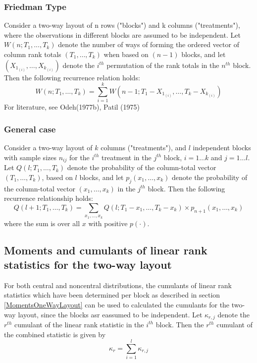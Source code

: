 \subsubsection{Friedman Type}
Consider a two-way  layout of n rows ("blocks") and k columns ("treatments"), where the observations in different blocks are assumed to be independent. Let $W(n;T_1,...,T_k)$ denote the number of ways of forming the ordered vector of column rank totals $(T_1,\ldots,T_k)$ when based on $(n-1)$ blocks, and let $(X_{1_{(i)}},\ldots,X_{k_{(i)}})$ denote the $i^{th}$ permutation of the rank totals in the $n^{th}$ block. Then the following recurrence relation holds:
\begin{equation} 
	W(n; T_1,\ldots,T_k) = \sum_{i=1}^k W(n-1; T_1 - X_{1_{(i)}},\ldots, T_k - X_{k_{(i)}})
\end{equation}
For literature, see Odeh(1977b), Patil (1975)

\subsubsection{General case}
Consider a two-way  layout of $k$ columns ("treatments"), and $l$ independent blocks with sample sizes $n_{ij}$ for the $i^{th}$ treatment in the $j^{th}$ block, $i=1 \ldots k$ and $j=1 \ldots l$. Let $Q(l; T_1,\ldots,T_k)$ denote the probability of the column-total vector $(T_1,\ldots,T_k)$, based on $l$ blocks, and let $p_j(x_1,\ldots,x_k)$ denote the probability of  the column-total vector $(x_1,\ldots,x_k)$ in the $j^{th}$ block. Then the following recurrence relationship holds:
\begin{equation} 
	Q(l+1; T_1,\ldots,T_k) = \sum_{x_1,\ldots,x_k} Q(l; T_1 - x_{1},\ldots, T_k - x_{k}) \times p_{n+1}(x_1,\ldots,x_k)
\end{equation}
where the sum is over all $x$ with positive $p(\cdot)$.





\subsection{Moments and cumulants of linear rank statistics for the two-way layout}
For both central and noncentral distributions, the cumulants of linear rank statistics which have been determined per block as described in section \ref{MomentsOneWayLayout} can be used to calculated the cumulants for the two-way layout, since the blocks asr eassumed to be independent. Let $\kappa_{r,j}$ denote the $r^{th}$ cumulant of the linear rank statistic in the $i^{th}$ block. Then the $r^{th}$ cumulant of the combined statistic is given by
\begin{equation} 
	\kappa_r = \sum_{i=1}^l \kappa_{r,j}
\end{equation}


